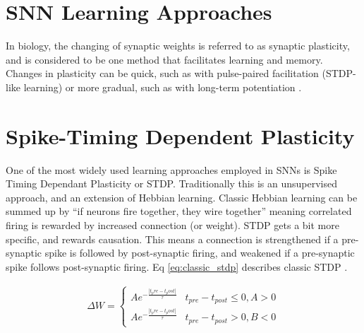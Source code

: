     
    \section{SNN Learning Approaches}
    In biology, the changing of synaptic weights is referred to as synaptic
    plasticity, and is considered to be one method that facilitates learning and
    memory. Changes in plasticity can be quick, such as with pulse-paired
    facilitation (STDP-like learning) or more gradual, such as with long-term
    potentiation \cite{ponulak_2011}.
    
    \section{Spike-Timing Dependent Plasticity}
    One of the most widely used learning approaches employed in SNNs is Spike
    Timing Dependant Plasticity or STDP. Traditionally this is an unsupervised
    approach, and an extension of Hebbian learning. Classic Hebbian learning can
    be summed up by ``if neurons fire together, they wire together'' meaning
    correlated firing is rewarded by increased connection (or weight). STDP gets
    a bit more specific, and rewards causation. This means a connection is
    strengthened if a pre-synaptic spike is followed by post-synaptic firing,
    and weakened if a pre-synaptic spike follows post-synaptic firing. Eq
    \ref{eq:classic_stdp} describes classic STDP \cite{tavanaei_2019}.

    \begin{align}
        \Delta W =
        \begin{cases} 
          Ae^{-\frac{|t_pre-t_post|}{\tau}} & t_{pre} - t_{post} \leq 0, A > 0
          \\ Ae^{-\frac{|t_pre-t_post|}{\tau}} & t_{pre} - t_{post} > 0, B < 0
       \end{cases} \label{eq:classic_stdp}
    \end{align}

